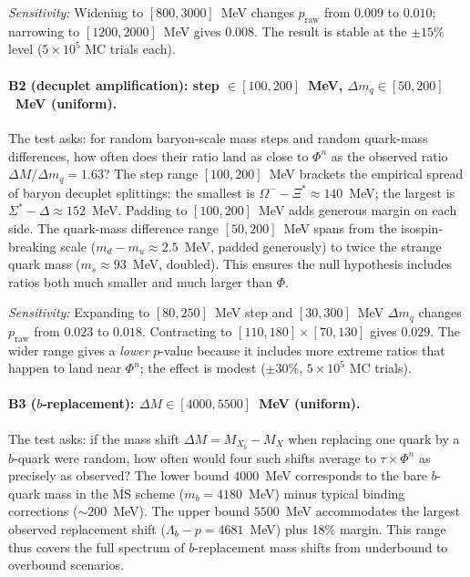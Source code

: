 \documentclass[11pt,a4paper]{article}
\begin{document}
\emph{Sensitivity:} Widening to $[800, 3000]$~MeV changes $p_{\mathrm{raw}}$
from $0.009$ to $0.010$; narrowing to $[1200, 2000]$~MeV gives $0.008$.
The result is stable at the $\pm 15\%$ level ($5 \times 10^5$ MC trials each).

\paragraph{B2 (decuplet amplification): step $\in [100, 200]$~MeV,
           $\Delta m_q \in [50, 200]$~MeV (uniform).}
The test asks: for random baryon-scale mass steps and random quark-mass
differences, how often does their ratio land as close to $\Phi^n$ as
the observed ratio $\Delta M / \Delta m_q = 1.63$?
The step range $[100, 200]$~MeV brackets the empirical spread of baryon
decuplet splittings: the smallest is
$\Omega^- - \Xi^* \approx 140$~MeV; the largest is
$\Sigma^* - \Delta \approx 152$~MeV. Padding to $[100, 200]$~MeV
adds generous margin on each side.
The quark-mass difference range $[50, 200]$~MeV spans from the
isospin-breaking scale ($m_d - m_u \approx 2.5$~MeV, padded generously)
to twice the strange quark mass ($m_s \approx 93$~MeV, doubled). This ensures
the null hypothesis includes ratios both much smaller and much larger
than $\Phi$.

\emph{Sensitivity:} Expanding to $[80, 250]$~MeV step and
$[30, 300]$~MeV $\Delta m_q$ changes $p_{\mathrm{raw}}$ from $0.023$
to $0.018$. Contracting to $[110, 180] \times [70, 130]$ gives $0.029$.
The wider range gives a \emph{lower} $p$-value because it includes
more extreme ratios that happen to land near $\Phi^n$; the effect is
modest ($\pm 30\%$, $5 \times 10^5$ MC trials).

\paragraph{B3 ($b$-replacement): $\Delta M \in [4000, 5500]$~MeV (uniform).}
The test asks: if the mass shift $\Delta M = M_{X_b} - M_{X}$ when
replacing one quark by a $b$-quark were random, how often would
four such shifts average to $\tau \times \Phi^n$ as precisely as
observed?
The lower bound $4000$~MeV corresponds to the bare $b$-quark mass
in the $\overline{\text{MS}}$ scheme ($m_b = 4180$~MeV) minus typical
binding corrections ($\sim 200$~MeV).
The upper bound $5500$~MeV accommodates the largest observed replacement
shift ($\Lambda_b - p = 4681$~MeV) plus 18\% margin.
This range thus covers the full spectrum of $b$-replacement mass shifts
from underbound to overbound scenarios.
\end{document}
